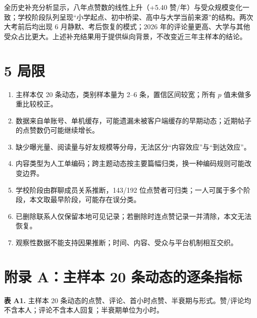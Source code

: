 全历史补充分析显示，八年点赞数的线性上升（+5.40 赞/年）与受众规模变化一致；学校阶段队列呈现“小学起点、初中桥梁、高中与大学当前来源”的结构。两次大考前后均出现 6 月静默、考后恢复的模式；2026 年的评论量更高、大学与其他受众占比更大。上述补充结果用于提供纵向背景，不改变近三年主样本的结论。

\section{5 局限}
\begin{enumerate}[leftmargin=1.3em,itemsep=1pt,topsep=2pt]
\item 主样本仅 20 条动态，类别样本量为 2--6 条，置信区间较宽；所有 $p$ 值未做多重比较校正。
\item 数据来自单账号、单机缓存，可能遗漏未被客户端缓存的早期动态；近期帖子的点赞数仍可能继续增长。
\item 缺少曝光量、阅读量与好友规模等分母，无法区分“内容效应”与“到达效应”。
\item 内容类型为人工单编码；跨主题动态按主要篇幅归类，换一种编码规则可能改变边界。
\item 学校阶段由群聊成员关系推断，143/192 位点赞者可归类；一人可属于多个阶段，本文取最早阶段，可能存在误分类。
\item 已删除联系人仅保留本地可见记录；若删除时连点赞记录一并清除，本文无法恢复。
\item 观察性数据不能支持因果推断；时间、内容、受众与平台机制相互交织。
\end{enumerate}

\clearpage

\section*{附录 A：主样本 20 条动态的逐条指标}

\noindent\textbf{表 A1.} 主样本 20 条动态的点赞、评论、首小时点赞、半衰期与形式。赞/评论均不含本人；评论不含本人回复；半衰期单位为小时。
\vspace{2pt}

